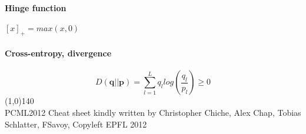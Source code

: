 \documentclass[7pt]{scrartcl}
\renewcommand{\vec}{\mathbf}
\begin{document}
\begin{multicols}{4}
\paragraph{Hinge function}
$[x]_+ = max(x,0)$
\paragraph{Cross-entropy, divergence}
\[D(\vec{q}||\vec{p}) = \sum_{l=1}^L q_l log(\frac{q_l}{p_l}) \geq 0\]
\line(1,0){140} \\
\tiny
PCML2012 Cheat sheet kindly written by Christopher Chiche, Alex Chap, Tobias Schlatter, FSavoy, Copyleft EPFL 2012 
\end{multicols}
\end{document}
